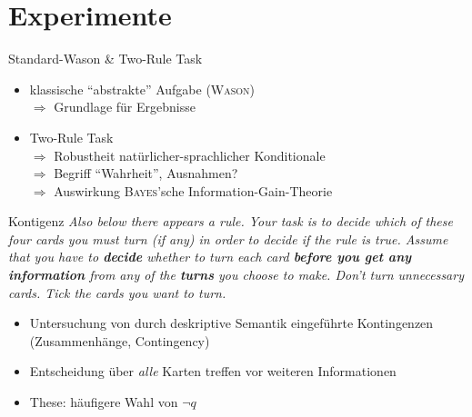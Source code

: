 
\section{Experimente}

\begin{frame}{Standard-Wason \& Two-Rule Task {\scriptsize \cite[S.~95-96]{stenningHumanReasoningCognitive2008}}}
    \begin{itemize}
        \item klassische \enquote{abstrakte} Aufgabe (\textsc{Wason}) \\
            $\Rightarrow$ Grundlage für Ergebnisse
        \pause

        \item Two-Rule Task \\
            $\Rightarrow$ Robustheit natürlicher-sprachlicher Konditionale \\
            $\Rightarrow$ Begriff \enquote{Wahrheit}, Ausnahmen? \\
            \pause
            $\Rightarrow$ Auswirkung \textsc{Bayes}'sche Information-Gain-Theorie
    \end{itemize}
\end{frame}


\begin{frame}{Kontigenz {\scriptsize \cite[S.~96-97]{stenningHumanReasoningCognitive2008}}}
    \emph{
        {\small Also below there appears a rule.
        Your task is to decide which of these four cards you must turn (if any) in order to decide if the rule is true.}
        \alert{Assume that you have to \textbf{decide} whether to turn each card \textbf{before you get any information} from any of the \textbf{turns} you choose to make.}
        {\small Don't turn unnecessary cards. Tick the cards you want to turn.}
    }

    \begin{itemize}
        \item Untersuchung von durch deskriptive Semantik eingeführte Kontingenzen {\footnotesize (Zusammenhänge, Contingency)}
        \item Entscheidung über \emph{alle} Karten treffen vor weiteren Informationen
        \pause
        \item These: häufigere Wahl von $\lnot q$
    \end{itemize}
\end{frame}


